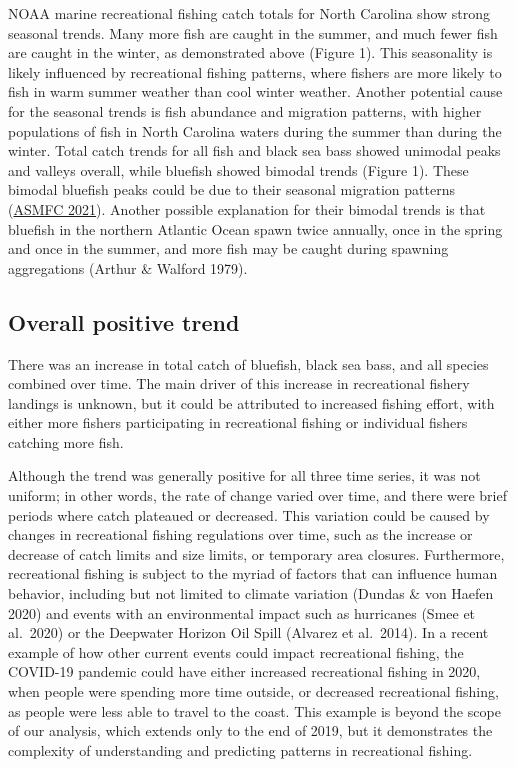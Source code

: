 \documentclass[
  12pt,
]{article}
\begin{document}
NOAA marine recreational fishing catch totals for North Carolina show
strong seasonal trends. Many more fish are caught in the summer, and
much fewer fish are caught in the winter, as demonstrated above (Figure
1). This seasonality is likely influenced by recreational fishing
patterns, where fishers are more likely to fish in warm summer weather
than cool winter weather. Another potential cause for the seasonal
trends is fish abundance and migration patterns, with higher populations
of fish in North Carolina waters during the summer than during the
winter. Total catch trends for all fish and black sea bass showed
unimodal peaks and valleys overall, while bluefish showed bimodal trends
(Figure 1). These bimodal bluefish peaks could be due to their seasonal
migration patterns (\href{http://www.asmfc.org/species/bluefish}{ASMFC
2021}). Another possible explanation for their bimodal trends is that
bluefish in the northern Atlantic Ocean spawn twice annually, once in
the spring and once in the summer, and more fish may be caught during
spawning aggregations (Arthur \& Walford 1979).

\hypertarget{overall-positive-trend}{%
\subsection{Overall positive trend}\label{overall-positive-trend}}

There was an increase in total catch of bluefish, black sea bass, and
all species combined over time. The main driver of this increase in
recreational fishery landings is unknown, but it could be attributed to
increased fishing effort, with either more fishers participating in
recreational fishing or individual fishers catching more fish.

Although the trend was generally positive for all three time series, it
was not uniform; in other words, the rate of change varied over time,
and there were brief periods where catch plateaued or decreased. This
variation could be caused by changes in recreational fishing regulations
over time, such as the increase or decrease of catch limits and size
limits, or temporary area closures. Furthermore, recreational fishing is
subject to the myriad of factors that can influence human behavior,
including but not limited to climate variation (Dundas \& von Haefen
2020) and events with an environmental impact such as hurricanes (Smee
et al.~2020) or the Deepwater Horizon Oil Spill (Alvarez et al.~2014).
In a recent example of how other current events could impact
recreational fishing, the COVID-19 pandemic could have either increased
recreational fishing in 2020, when people were spending more time
outside, or decreased recreational fishing, as people were less able to
travel to the coast. This example is beyond the scope of our analysis,
which extends only to the end of 2019, but it demonstrates the
complexity of understanding and predicting patterns in recreational
fishing.
\end{document}
